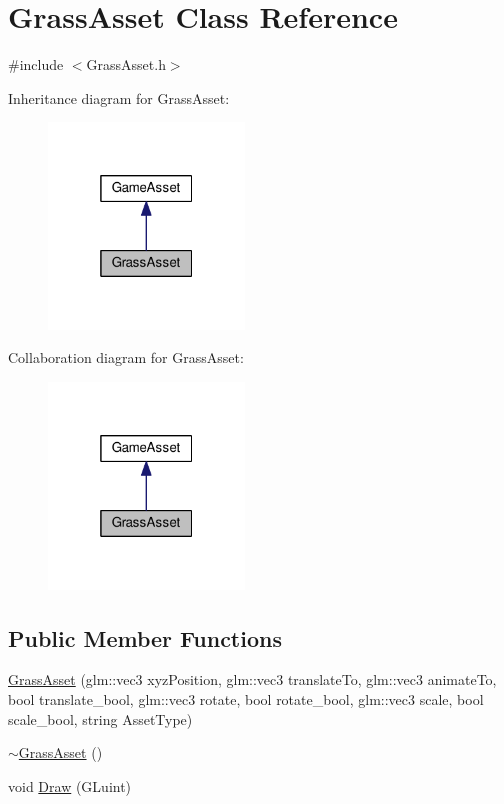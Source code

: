 \hypertarget{class_grass_asset}{}\section{Grass\+Asset Class Reference}
\label{class_grass_asset}


{\ttfamily \#include $<$Grass\+Asset.\+h$>$}



Inheritance diagram for Grass\+Asset\+:\nopagebreak
\begin{figure}[H]
\begin{center}
\leavevmode
\includegraphics[width=148pt]{class_grass_asset__inherit__graph}
\end{center}
\end{figure}


Collaboration diagram for Grass\+Asset\+:\nopagebreak
\begin{figure}[H]
\begin{center}
\leavevmode
\includegraphics[width=148pt]{class_grass_asset__coll__graph}
\end{center}
\end{figure}
\subsection*{Public Member Functions}
\begin{DoxyCompactItemize}
\item 
\hyperlink{class_grass_asset_a6dd2fdfec9aa1396282f0711912b5740}{Grass\+Asset} (glm\+::vec3 xyz\+Position, glm\+::vec3 translate\+To, glm\+::vec3 animate\+To, bool translate\+\_\+bool, glm\+::vec3 rotate, bool rotate\+\_\+bool, glm\+::vec3 scale, bool scale\+\_\+bool, string Asset\+Type)
\item 
\hyperlink{class_grass_asset_a07e2206bacd2ec120f27f20e5df635b7}{$\sim$\+Grass\+Asset} ()
\item 
void \hyperlink{class_grass_asset_a0178a72c5bf2f00bcc6a240b851f3a25}{Draw} (G\+Luint)
\end{DoxyCompactItemize}


